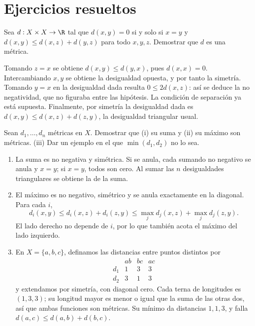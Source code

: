 \section{Ejercicios resueltos}
\begin{ejercicio}
Sea $d:X\times X\to\R$ tal que $d(x,y)=0$ si y solo si $x=y$ y $d(x,y)\le d(x,z)+d(y,z)$ para todo $x,y,z$. Demostrar que $d$ es una métrica.
\end{ejercicio}
\begin{solucion}
Tomando $z=x$ se obtiene $d(x,y)\le d(y,x)$, pues $d(x,x)=0$. Intercambiando $x,y$ se obtiene la desigualdad opuesta, y por tanto la simetría. Tomando $y=x$ en la desigualdad dada resulta $0\le2d(x,z)$: así se deduce la no negatividad, que no figuraba entre las hipótesis. La condición de separación ya está supuesta. Finalmente, por simetría la desigualdad dada es $d(x,y)\le d(x,z)+d(z,y)$, la desigualdad triangular usual.
\end{solucion}

\begin{ejercicio}
Sean $d_1,\ldots,d_n$ métricas en $X$. Demostrar que (i) su suma y (ii) su máximo son métricas. (iii) Dar un ejemplo en el que $\min(d_1,d_2)$ no lo sea.
\end{ejercicio}
\begin{solucion}
\begin{enumerate}[label=(\roman*)]
\item La suma es no negativa y simétrica. Si se anula, cada sumando no negativo se anula y $x=y$; si $x=y$, todos son cero. Al sumar las $n$ desigualdades triangulares se obtiene la de la suma.
\item El máximo es no negativo, simétrico y se anula exactamente en la diagonal. Para cada $i$,
\[
d_i(x,y)\le d_i(x,z)+d_i(z,y)\le \max_j d_j(x,z)+\max_jd_j(z,y).
\]
El lado derecho no depende de $i$, por lo que también acota el máximo del lado izquierdo.
\item En $X=\{a,b,c\}$, definamos las distancias entre puntos distintos por
\[
\begin{array}{c|ccc}
&ab&bc&ac\\\hline
d_1&1&3&3\\
d_2&3&1&3
\end{array}
\]
y extendamos por simetría, con diagonal cero. Cada terna de longitudes es $(1,3,3)$; su longitud mayor es menor o igual que la suma de las otras dos, así que ambas funciones son métricas. Su mínimo da distancias $1,1,3$, y falla $d(a,c)\le d(a,b)+d(b,c)$.
\end{enumerate}
\end{solucion}


